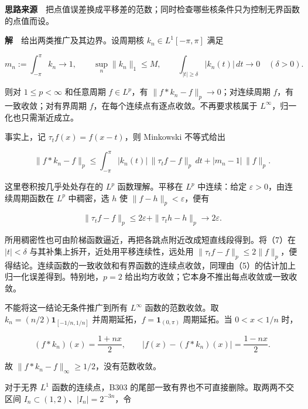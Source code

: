 \documentclass[11pt,a4paper]{article}
\begin{document}
\textbf{思路来源}　把点值误差换成平移差的范数；同时检查哪些核条件只为控制无界函数的点值而设。

\textbf{解}　给出两类推广及其边界。设周期核 \(k_n\in L^1[-\pi,\pi]\)
满足

\begin{equation}
m_n:=\int_{-\pi}^{\pi}k_n\longrightarrow1,\qquad
\sup_n\|k_n\|_1\le M,\qquad
\int_{|t|\ge\delta}|k_n(t)|\,dt\longrightarrow0
\quad(\delta>0).
\tag{6}
\end{equation}

则对 \(1\le p<\infty\) 和任意周期 \(f\in L^p\)，有
\(\|f*k_n-f\|_p\to0\)；对连续周期 \(f\)，有一致收敛；对有界周期
\(f\)，在每个连续点有逐点收敛。不再要求核属于
\(L^\infty\)，归一化也只需渐近成立。

事实上，记 \(\tau_tf(x)=f(x-t)\)，则 Minkowski 不等式给出

\begin{equation}
\|f*k_n-f\|_p
\le\int_{-\pi}^{\pi}|k_n(t)|\,\|\tau_tf-f\|_p\,dt
+|m_n-1|\,\|f\|_p.
\tag{7}
\end{equation}

这里卷积按几乎处处存在的 \(L^p\) 函数理解。平移在 \(L^p\) 中连续：给定
\(\varepsilon>0\)，由连续周期函数在 \(L^p\) 中稠密，选 \(h\) 使
\(\|f-h\|_p<\varepsilon\)，便有

\begin{equation}
\|\tau_tf-f\|_p\le2\varepsilon+\|\tau_th-h\|_p\longrightarrow2\varepsilon.
\tag{8}
\end{equation}

所用稠密性也可由阶梯函数逼近，再把各跳点附近改成短直线段得到。将（7）在
\(|t|<\delta\) 与其补集上拆开，近处用平移连续性，远处用
\(\|\tau_tf-f\|_p\le2\|f\|_p\)，便得结论。连续函数的一致收敛和有界函数的连续点收敛，同理由（5）的估计加上归一化误差得到。特别地，\(p=2\)
给出均方收敛；它本身不推出每点收敛或一致收敛。

不能将这一结论无条件推广到所有 \(L^\infty\) 函数的范数收敛。取
\(k_n=(n/2)\mathbf1_{[-1/n,1/n]}\) 并周期延拓，\(f=\mathbf1_{(0,\pi)}\)
周期延拓。当 \(0<x<1/n\) 时，

\begin{equation}
(f*k_n)(x)=\frac{1+nx}{2},\qquad
|f(x)-(f*k_n)(x)|=\frac{1-nx}{2}.
\tag{9}
\end{equation}

故 \(\|f*k_n-f\|_\infty\ge1/2\)，没有范数收敛。

对于无界 \(L^1\) 函数的连续点，B303
的尾部一致有界也不可直接删除。取两两不交区间
\(I_n\subset(1,2)\)、\(|I_n|=2^{-3n}\)，令
\end{document}
